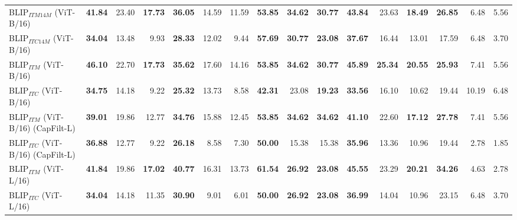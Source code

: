 \begin{table}[ht]
\begin{adjustbox}{max width=\textwidth}
\begin{tabular}{l|rrr|rrr|rrr|rrr|rrr}
 BLIP$_{ITM 14M}$ (ViT-B/16)         & \textbf{41.84} & 23.40          & \textbf{17.73} & \textbf{36.05} & 14.59          & 11.59          & \textbf{53.85} & \textbf{34.62} & \textbf{30.77} & \textbf{43.84} & 23.63          & \textbf{18.49} & \textbf{26.85} & 6.48           & 5.56           \\
 BLIP$_{ITC 14M}$ (ViT-B/16)         & \textbf{34.04} & 13.48          & 9.93           & \textbf{28.33} & 12.02          & 9.44           & \textbf{57.69} & \textbf{30.77} & \textbf{23.08} & \textbf{37.67} & 16.44          & 13.01          & 17.59          & 6.48           & 3.70           \\
 BLIP$_{ITM}$ (ViT-B/16)             & \textbf{46.10} & 22.70          & \textbf{17.73} & \textbf{35.62} & 17.60          & 14.16          & \textbf{53.85} & \textbf{34.62} & \textbf{30.77} & \textbf{45.89} & \textbf{25.34} & \textbf{20.55} & \textbf{25.93} & 7.41           & 5.56           \\
 BLIP$_{ITC}$ (ViT-B/16)             & \textbf{34.75} & 14.18          & 9.22           & \textbf{25.32} & 13.73          & 8.58           & \textbf{42.31} & 23.08          & \textbf{19.23} & \textbf{33.56} & 16.10          & 10.62          & 19.44          & 10.19          & 6.48           \\
 BLIP$_{ITM}$ (ViT-B/16) (CapFilt-L) & \textbf{39.01} & 19.86          & 12.77          & \textbf{34.76} & 15.88          & 12.45          & \textbf{53.85} & \textbf{34.62} & \textbf{34.62} & \textbf{41.10} & 22.60          & \textbf{17.12} & \textbf{27.78} & 7.41           & 5.56           \\
 BLIP$_{ITC}$ (ViT-B/16) (CapFilt-L) & \textbf{36.88} & 12.77          & 9.22           & \textbf{26.18} & 8.58           & 7.30           & \textbf{50.00} & 15.38          & 15.38          & \textbf{35.96} & 13.36          & 10.96          & 19.44          & 2.78           & 1.85           \\
 BLIP$_{ITM}$ (ViT-L/16)             & \textbf{41.84} & 19.86          & \textbf{17.02} & \textbf{40.77} & 16.31          & 13.73          & \textbf{61.54} & \textbf{26.92} & \textbf{23.08} & \textbf{45.55} & 23.29          & \textbf{20.21} & \textbf{34.26} & 4.63           & 2.78           \\
 BLIP$_{ITC}$ (ViT-L/16)             & \textbf{34.04} & 14.18          & 11.35          & \textbf{30.90} & 9.01           & 6.01           & \textbf{50.00} & \textbf{26.92} & \textbf{23.08} & \textbf{36.99} & 14.04          & 10.96          & 23.15          & 6.48           & 3.70           \\

\end{tabular}
\end{adjustbox}
\end{table}
